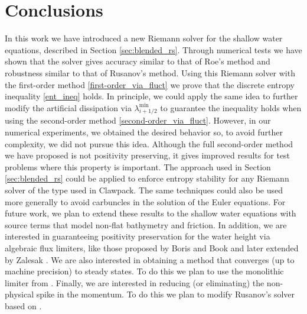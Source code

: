 \documentclass[preprint, 11pt]{article}
\begin{document}




\section{Conclusions}\label{sec:conclusion}
In this work we have introduced a new Riemann solver for the shallow water
equations, described in Section \ref{sec:blended_rs}.  Through numerical tests we have
shown that the solver gives accuracy similar to that of Roe's method and
robustness similar to that of Rusanov's method.
Using this Riemann solver with the first-order method \eqref{first-order_via_fluct} we
prove that the discrete entropy inequality \eqref{ent_ineq} holds.
In principle, we could apply the same idea to further modify the artificial dissipation
via $\lambda^{\min}_{i+1/2}$ to guarantee the inequality holds when using the second-order method \eqref{second-order_via_fluct}. 
However, in our numerical experiments, we obtained the desired behavior 
so, to avoid further complexity, we did not pursue this idea. 
Although the full second-order method we have proposed is not 
positivity preserving, it gives improved results for test problems
where this property is important.  The approach used in Section
\ref{sec:blended_rs} could be applied to enforce entropy stability for any Riemann
solver of the type used in Clawpack.  The same techniques could also
be used more generally to avoid carbuncles in the solution of the
Euler equations.
For future work, we plan to extend these results to the shallow water equations 
with source terms that model non-flat bathymetry and friction. In addition, we 
are interested in guaranteeing positivity preservation for the water height
via algebraic flux limiters, like those proposed by Boris and Book \cite{boris1973flux} 
and later extended by Zalesak \cite{zalesak1979fully}.
{\color{OliveGreen}
We are also interested in obtaining a method that converges (up to machine precision) 
to steady states. To do this we plan to use the monolithic limiter from \cite{kuzmin2020monolithic}.}
Finally, we are interested in reducing (or eliminating) the non-physical spike in
the momentum. To do this we plan to modify Rusanov's solver based on \cite[Section 5.1]{navas2019improved}. 
\end{document}
